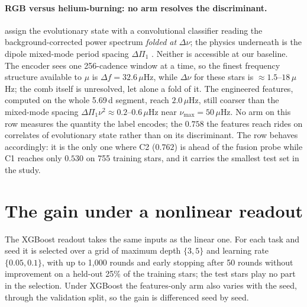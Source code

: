 \documentclass{article}
\begin{document}
\paragraph{RGB versus helium-burning: no arm resolves the discriminant.} \citet{sreenivas2026} assign
the evolutionary state with a convolutional classifier reading the background-corrected power spectrum
\emph{folded at} $\Delta\nu$; the physics underneath is the dipole mixed-mode period spacing
$\Delta\Pi_{1}$ \citep{bedding2011}. Neither is accessible at our baseline. The encoder sees one
256-cadence window at a time, so the finest frequency structure available to $\mu$ is
$\Delta f = 32.6\,\mu$Hz, while $\Delta\nu$ for these stars is $\approx 1.5$--$18\,\mu$Hz; the comb
itself is unresolved, let alone a fold of it. The engineered features, computed on the whole 5.69\,d
segment, reach $2.0\,\mu$Hz, still coarser than the mixed-mode spacing
$\Delta\Pi_{1}\nu^{2} \approx 0.2$--$0.6\,\mu$Hz near $\nu_{\max} = 50\,\mu$Hz. No arm on this row
measures the quantity the label encodes; the $0.758$ the features reach rides on correlates of
evolutionary state rather than on its discriminant. The row behaves accordingly: it is the only one
where C2 ($0.762$) is ahead of the fusion probe while C1 reaches only $0.530$ on 755 training stars,
and it carries the smallest test set in the study.

\section{The gain under a nonlinear readout}
\label{app:readout}

\begin{table}[H]
\caption{What 128 added columns change, relative to the 25 features alone, under each frozen readout
(mean over six encoder seeds; absolute scores are in Table~\ref{tab:scorecard}). $+\mu$: our encoder.
No prediction term: the same recipe trained without the GRU prediction term. Untrained: a randomly
initialised encoder, which is a single encoder and carries no band. Bold: beyond $2\,\mathrm{SE}$. The
last row counts tasks won, tied and lost at that bar.}
\label{tab:readout}
\centering
\scriptsize

\end{table}

The XGBoost readout takes the same inputs as the linear one. For each task and seed it is selected
over a grid of maximum depth $\{3,5\}$ and learning rate $\{0.05,0.1\}$, with up to 1{,}000 rounds
and early stopping after 50 rounds without improvement on a held-out 25\% of the training stars;
the test stars play no part in the selection. Under XGBoost the features-only arm also varies with
the seed, through the validation split, so the gain is differenced seed by seed.
\end{document}
